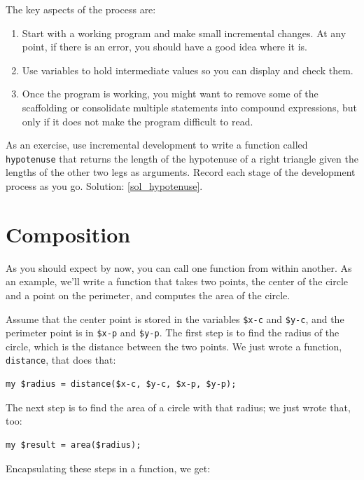 The key aspects of the process are:

\begin{enumerate}

\item Start with a working program and make small incremental changes. 
At any point, if there is an error, you should have a good idea
where it is.

\item Use variables to hold intermediate values so you can
display and check them.

\item Once the program is working, you might want to remove some of
the scaffolding or consolidate multiple statements into compound
expressions, but only if it does not make the program difficult to
read.

\end{enumerate}

\label{hypotenuse}
As an exercise, use incremental development to write a function
called {\tt hypotenuse} that returns the length of the hypotenuse of a
right triangle given the lengths of the other two legs as arguments.
Record each stage of the development process as you go.
Solution: \ref{sol_hypotenuse}.



\section{Composition}

As you should expect by now, you can call one function from within
another.  As an example, we'll write a function that takes two points,
the center of the circle and a point on the perimeter, and computes
the area of the circle.

Assume that the center point is stored in the variables {\tt \$x-c} and
{\tt \$y-c}, and the perimeter point is in {\tt \$x-p} and {\tt \$y-p}. The
first step is to find the radius of the circle, which is the distance
between the two points.  We just wrote a function, {\tt
distance}, that does that:

\begin{verbatim}
my $radius = distance($x-c, $y-c, $x-p, $y-p);
\end{verbatim}
%
The next step is to find the area of a circle with that radius;
we just wrote that, too:

\begin{verbatim}
my $result = area($radius);
\end{verbatim}
%
Encapsulating these steps in a function, we get:

